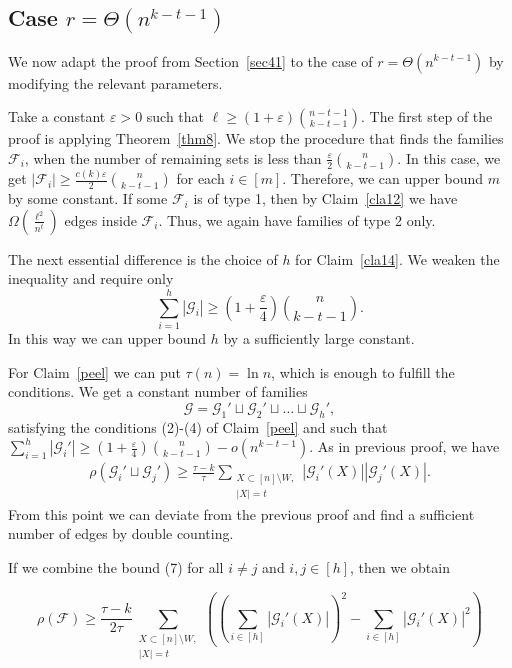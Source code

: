 \documentclass[12pt,a4paper]{article}
\newcommand{\ff}{\mathcal{F}}
\newcommand{\cG}{\mathcal{G}}
\begin{document}
\subsection{Case $r=\Theta(n^{k-t-1})$}\label{sec43}

We now adapt the proof from Section~\ref{sec41} to the case of $r = \Theta(n^{k-t-1})$ by modifying the relevant parameters. 

Take a constant $\varepsilon > 0$ such that $\ell \geqslant (1 + \varepsilon)\binom{n-t-1}{k-t-1}.$ The first step of the proof is applying Theorem~\ref{thm8}. We stop the procedure that finds the families $\ff_i$, when the number of remaining sets is less than $\frac{\varepsilon}{2}\binom{n}{k-t-1}$. In this case, we get
$|\ff_i| \geqslant \frac{c(k)\varepsilon}{2} \binom{n}{k-t-1}$ for each $i \in [m]$. Therefore, we can upper bound $m$ by some constant. If some $\ff_i$ is of type 1, then by Claim~\ref{cla12} we have $\Omega(\frac{\ell^2}{n^t})$ edges inside $\ff_i$. Thus, we again have families of type 2 only.

The next essential difference is the choice of $h$ for Claim~\ref{cla14}. We weaken the inequality and require only
$$\sum_{i=1}^h |\cG_i| \geqslant \left(1+\frac{\varepsilon}{4}\right)\binom{n}{k-t-1}.$$
In this way we can upper bound $h$ by a sufficiently large constant. 

For Claim~\ref{peel} we can put $\tau(n)=\ln n$, which is enough to fulfill the conditions. We get a constant number of families $$\cG = \cG_1' \sqcup \cG_2' \sqcup \ldots \sqcup \cG_h',$$
satisfying the conditions (2)-(4) of Claim~\ref{peel} and such that $\sum_{i=1}^h|\cG_i'| \geqslant \left(1+\frac{\varepsilon}{4}\right)\binom{n}{k-t-1} - o(n^{k-t-1})$. As in previous proof, we have
\begin{align}\label{eq7}
\rho(\mathcal{G}_i' \sqcup \mathcal{G}_j') \geqslant \frac{\tau-k}{\tau} \sum_{\substack{X \subset [n] \setminus W,\\ |X|=t}} |\mathcal{G}_i'(X)||\mathcal{G}_j'(X)|.
\end{align}
From this point we can deviate from the previous proof and find a sufficient number of edges by double counting.

If we combine the bound (7) for all $i \neq j$ and $i,j \in [h]$, then we obtain

    $$\rho(\mathcal{F}) \geqslant \frac{\tau - k}{2\tau} \sum_{\substack{X \subset [n] \setminus W,\\ |X|=t}}\left(\left(\sum_{i \in [h]}|\mathcal{G}_i'(X)|\right)^2 - \sum_{i \in [h]}|\mathcal{G}_i'(X)|^2\right)$$
\end{document}
